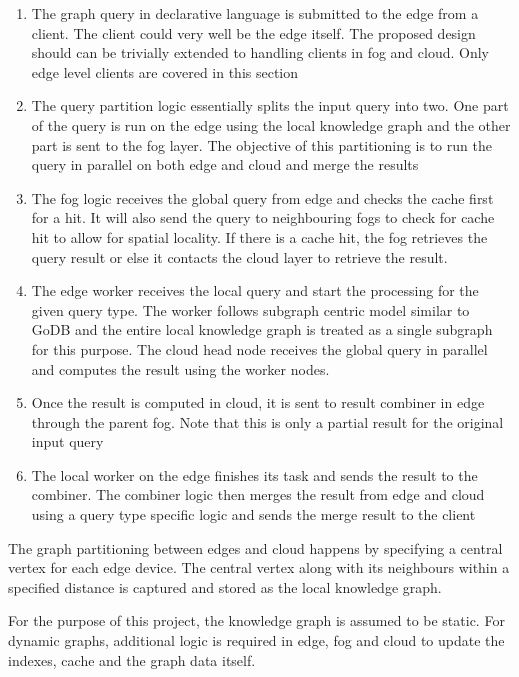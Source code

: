 \documentclass[conference]{IEEEtran}
\begin{document}
\begin{enumerate}%
	\item The graph query in declarative language is submitted to the edge from a client. The client could very well be the edge itself. The proposed design should can be trivially extended to handling clients in fog and cloud. Only edge level clients are covered in this section
	\item The query partition logic essentially splits the input query into two. One part of the query is run on the edge using the local knowledge graph and the other part is sent to the fog layer. The objective of this partitioning is to run the query in parallel on both edge and cloud and merge the results
	\item The fog logic receives the global query from edge and checks the cache first for a hit. It will also send the query to neighbouring fogs to check for cache hit to allow for spatial locality. If there is a cache hit, the fog retrieves the query result or else it contacts the cloud layer to retrieve the result. 
	\item The edge worker receives the local query and start the processing for the given query type. The worker follows subgraph centric model similar to GoDB and the entire local knowledge graph is treated as a single subgraph for this purpose. The cloud head node receives the global query in parallel and computes the result using the worker nodes. 
	\item Once the result is computed in cloud, it is sent to result combiner in edge through the parent fog. Note that this is only a partial result for the original input query
	\item The local worker on the edge finishes its task and sends the result to the combiner. The combiner logic then merges the result from edge and cloud using a query type specific logic and sends the merge result to the client 
\end{enumerate}

The graph partitioning between edges and cloud happens by specifying a central vertex for each edge device. The central vertex along with its neighbours within a specified distance is captured and stored as the local knowledge graph.

For the purpose of this project, the knowledge graph is assumed to be static. For dynamic graphs, additional logic is required in edge, fog and cloud to update the indexes, cache and the graph data itself.
\end{document}
